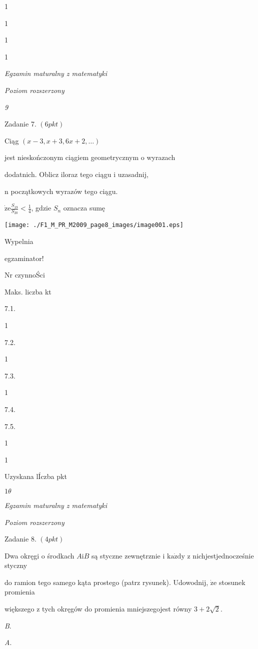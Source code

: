 \documentclass[a4paper,12pt]{article}
\begin{document}
1

1

1

1





{\it Egzamin maturalny z matematyki}

{\it Poziom rozszerzony}

{\it 9}

Zadanie 7. $(6pkt)$

Ciąg $(x-3,x+3,6x+2,\ldots)$

jest nieskończonym ciągiem geometrycznym o wyrazach

dodatnich. Oblicz iloraz tego ciągu i uzasadnij,

n początkowych wyrazów tego ciągu.

$\dot{\mathrm{z}}\mathrm{e} \displaystyle \frac{S_{19}}{S_{20}}<\frac{1}{4}$, gdzie $S_{n}$ oznacza sumę
\begin{center}
\texttt{[image: ./F1\_M\_PR\_M2009\_page8\_images/image001.eps]}
\end{center}
Wypelnia

egzaminator!

Nr czynnoŚci

Maks. liczba kt

7.1.

1

7.2.

1

7.3.

1

7.4.

7.5.

1

1

Uzyskana lÍczba pkt





$ 1\theta$

{\it Egzamin maturalny z matematyki}

{\it Poziom rozszerzony}

Zadanie 8. $(4pkt)$

Dwa okręgi o środkach $A\mathrm{i}B$ są styczne zewnętrznie i $\mathrm{k}\mathrm{a}\dot{\mathrm{z}}\mathrm{d}\mathrm{y}$ z nichjestjednocześnie styczny

do ramion tego samego kąta prostego (patrz rysunek). Udowodnij, $\dot{\mathrm{z}}\mathrm{e}$ stosunek promienia

większego z tych okręgów do promienia mniejszegojest równy $3+2\sqrt{2}.$

{\it B}.

{\it A}.
\end{document}
